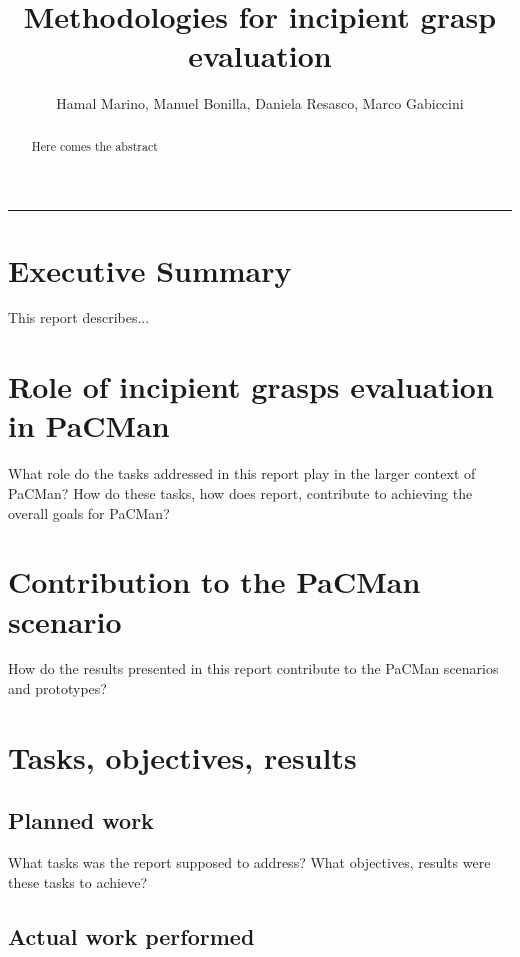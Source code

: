 \documentclass[a4paper,11pt,pdf]{pacmanreport}
\title{Methodologies for incipient grasp evaluation}
\author{Hamal Marino, Manuel Bonilla, Daniela Resasco, Marco Gabiccini}
\begin{document}
\maketitle

\begin{abstract}
\noindent Here comes the abstract
\end{abstract}


\vspace{.2em}
\hrule

\footnotesize

\tableofcontents

\normalsize

\newpage

\section*{Executive Summary}

This report describes...

\section*{Role of incipient grasps evaluation in PaCMan}

What role do the tasks addressed in this report play in the larger context of PaCMan? How do these tasks, how does report, contribute to achieving the overall goals for PaCMan?

\section*{Contribution to the PaCMan scenario}

How do the results presented in this report contribute to the PaCMan scenarios and prototypes?


\newpage

\section{Tasks, objectives, results}

\subsection{Planned work}

What tasks was the report supposed to address? What objectives, results were these tasks to achieve?

\subsection{Actual work performed}
\end{document}

